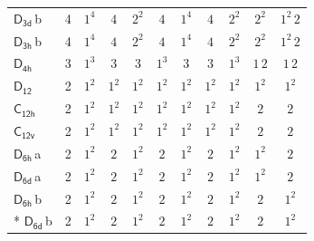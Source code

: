 \documentclass[10pt,a4paper]{article}
\numberwithin{equation}{section}
\newcommand{\grp}[1]{\mathsf{#1}}
\newcommand{\clsletter}[1]{\,{\scriptsize\color{black!55}#1}}
\begin{document}
{\begin{longtable}{@{}lrccccccccc@{}}
\href{D3d.pdf}{$\grp{D_{3d}}$}\clsletter{b} & 4 & $1^{4}$ & $4$ & $2^{2}$ & $4$ & $1^{4}$ & $4$ & $2^{2}$ & $2^{2}$ & $1^{2}\,2$\\
\href{D3h.pdf}{$\grp{D_{3h}}$}\clsletter{b} & 4 & $1^{4}$ & $4$ & $2^{2}$ & $4$ & $1^{4}$ & $4$ & $2^{2}$ & $2^{2}$ & $1^{2}\,2$\\
\href{D4h.pdf}{$\grp{D_{4h}}$} & 3 & $1^{3}$ & $3$ & $3$ & $1^{3}$ & $3$ & $3$ & $1^{3}$ & $1\,2$ & $1\,2$\\
\href{D12.pdf}{$\grp{D_{12}}$} & 2 & $1^{2}$ & $1^{2}$ & $1^{2}$ & $1^{2}$ & $1^{2}$ & $1^{2}$ & $1^{2}$ & $1^{2}$ & $1^{2}$\\
\href{C12h.pdf}{$\grp{C_{12h}}$} & 2 & $1^{2}$ & $1^{2}$ & $1^{2}$ & $1^{2}$ & $1^{2}$ & $1^{2}$ & $1^{2}$ & $2$ & $2$\\
\href{C12v.pdf}{$\grp{C_{12v}}$} & 2 & $1^{2}$ & $1^{2}$ & $1^{2}$ & $1^{2}$ & $1^{2}$ & $1^{2}$ & $1^{2}$ & $2$ & $2$\\
\href{D6h.pdf}{$\grp{D_{6h}}$}\clsletter{a} & 2 & $1^{2}$ & $2$ & $1^{2}$ & $2$ & $1^{2}$ & $2$ & $1^{2}$ & $1^{2}$ & $2$\\
\href{D6d.pdf}{$\grp{D_{6d}}$}\clsletter{a} & 2 & $1^{2}$ & $2$ & $1^{2}$ & $2$ & $1^{2}$ & $2$ & $1^{2}$ & $1^{2}$ & $2$\\
\href{D6h.pdf}{$\grp{D_{6h}}$}\clsletter{b} & 2 & $1^{2}$ & $2$ & $1^{2}$ & $2$ & $1^{2}$ & $2$ & $1^{2}$ & $2$ & $1^{2}$\\*
\href{D6d.pdf}{$\grp{D_{6d}}$}\clsletter{b} & 2 & $1^{2}$ & $2$ & $1^{2}$ & $2$ & $1^{2}$ & $2$ & $1^{2}$ & $2$ & $1^{2}$\\
\bottomrule\end{longtable}}
\end{document}
